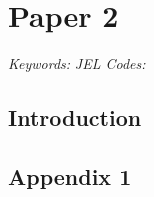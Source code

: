 \chapter{Paper 2}

\begin{abstract}
\end{abstract}

\noindent   \textit{Keywords:}      \newline
            \textit{JEL Codes:}



\pagebreak
\section{Introduction}\label{Paper2_intoduction}



\pagebreak





\pagebreak
\begin{subappendices}

\section{Appendix 1}\label{app_1}
 

\end{subappendices}
